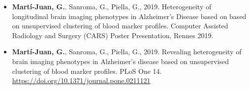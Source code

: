 \documentclass[12pt, b5paper,twoside]{tesi_upf}
\begin{document}
\begin{itemize}
\item \textbf{Martí-Juan, G.}. Sanroma, G., Piella, G., 2019. Heterogeneity of longitudinal brain imaging phenotypes in Alzheimer's Disease based on based on unsupervised clustering of blood marker profiles. Computer Assisted Radiology and Surgery (CARS) Poster Presentation, Rennes 2019.

\item \textbf{Martí-Juan, G.}, Sanroma, G., Piella, G., 2019. Revealing heterogeneity of brain imaging phenotypes in Alzheimer’s disease based on unsupervised clustering of blood marker profiles. PLoS One 14. \url{https://doi.org/10.1371/journal.pone.0211121}
\end{itemize}

\printindex
\end{document}
